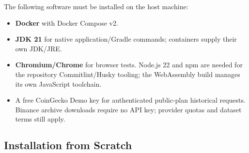 \documentclass{scrartcl}
\begin{document}
The following software must be installed on the host machine:
\begin{itemize}
  \item \textbf{Docker} with Docker Compose v2.
  \item \textbf{JDK 21} for native application/Gradle commands; containers supply their own JDK/JRE.
  \item \textbf{Chromium/Chrome} for browser tests. Node.js 22 and npm are needed for the
  repository Commitlint/Husky tooling; the WebAssembly build manages its own JavaScript toolchain.
  \item A free CoinGecko Demo key for authenticated public-plan historical requests. Binance
  archive downloads require no API key; provider quotas and dataset terms still apply.
\end{itemize}

\subsection{Installation from Scratch}\label{deployment-installation}
\end{document}
